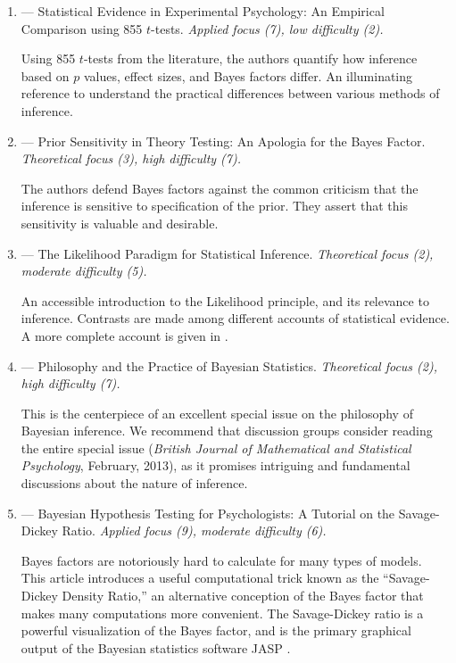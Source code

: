 \begin{enumerate}
\item
\textbf{} --- Statistical Evidence in Experimental Psychology: An Empirical Comparison using 855 $t$-tests. \emph{Applied focus (7), low difficulty (2).}

Using 855 $t$-tests from the literature, the authors quantify how inference based on $p$ values, effect sizes, and Bayes factors differ. An illuminating reference to understand the practical differences between various methods of inference.

\item
\textbf{} --- Prior Sensitivity in Theory Testing: An Apologia for the Bayes Factor. \emph{Theoretical focus (3), high difficulty (7).}

The authors defend Bayes factors against the common criticism that the inference is sensitive to specification of the prior.  They assert that this sensitivity is valuable and desirable.

\item
\textbf{} --- The Likelihood Paradigm for Statistical Inference. \emph{Theoretical focus (2), moderate difficulty (5).}

An accessible introduction to the Likelihood principle, and its relevance to inference. Contrasts are made among different accounts of statistical evidence. A more complete account is given in .

\item
\textbf{} --- Philosophy and the Practice of Bayesian Statistics. \emph{Theoretical focus (2), high difficulty (7).}

This is the centerpiece of an excellent special issue on the philosophy of Bayesian inference. We recommend that discussion groups consider reading the entire special issue (\textit{British Journal of Mathematical and Statistical Psychology}, February, 2013), as it promises intriguing and fundamental discussions about the nature of inference.

\item \textbf{} --- Bayesian Hypothesis Testing for Psychologists: A Tutorial on the Savage-Dickey Ratio. \emph{Applied focus (9), moderate difficulty (6).}

Bayes factors are notoriously hard to calculate for many types of models. This article introduces a useful computational trick known as the ``Savage-Dickey Density Ratio,'' an alternative conception of the Bayes factor that makes many computations more convenient. The Savage-Dickey ratio is a powerful visualization of the Bayes factor, and is the primary graphical output of the Bayesian statistics software JASP \cite{JASP2015}.


\end{enumerate}
